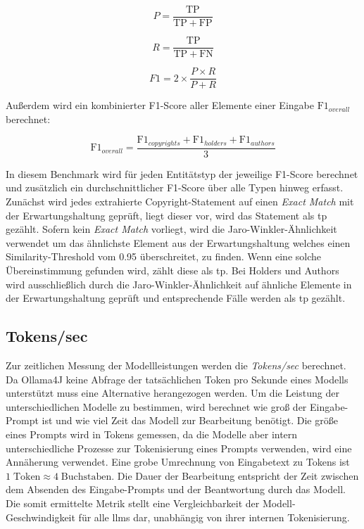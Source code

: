 \[
 P = \frac{\mathrm{TP}}{\mathrm{TP} + \mathrm{FP}}
\]

\[
 R = \frac{\mathrm{TP}}{\mathrm{TP} + \mathrm{FN}}
\]

\[
 F1 = 2 \times \frac{P \times R}{P + R}
\]

Außerdem wird ein kombinierter F1-Score aller Elemente einer Eingabe $\mathrm{F1}_{overall}$ berechnet:

\[
 \mathrm{F1}_{overall} = \frac{\mathrm{F1}_{copyrights} + \mathrm{F1}_{holders} + \mathrm{F1}_{authors}}{3}
\]

In diesem Benchmark wird für jeden Entitätstyp der jeweilige F1-Score berechnet und zusätzlich ein durchschnittlicher F1-Score über alle Typen hinweg erfasst.
Zunächst wird jedes extrahierte Copyright-Statement auf einen \textit{Exact Match} mit der Erwartungshaltung geprüft, liegt dieser vor, wird das Statement als \gls{tp} gezählt.
Sofern kein \textit{Exact Match} vorliegt, wird die Jaro-Winkler-Ähnlichkeit\autocite{noauthor_jarowinkler_nodate} verwendet um das ähnlichste Element aus der Erwartungshaltung welches einen Similarity-Threshold vom \num{0,95} überschreitet, zu finden.
Wenn eine solche Übereinstimmung gefunden wird, zählt diese als \gls{tp}.
Bei Holders und Authors wird ausschließlich durch die Jaro-Winkler-Ähnlichkeit auf ähnliche Elemente in der Erwartungshaltung geprüft und entsprechende Fälle werden als \gls{tp} gezählt.

\subsection{Tokens/sec}
Zur zeitlichen Messung der Modellleistungen werden die \textit{Tokens/sec} berechnet.
Da Ollama4J keine Abfrage der tatsächlichen Token pro Sekunde eines Modells unterstützt muss eine Alternative herangezogen werden.
Um die Leistung der unterschiedlichen Modelle zu bestimmen, wird berechnet wie groß der Eingabe-Prompt ist und wie viel Zeit das Modell zur Bearbeitung benötigt.
Die größe eines Prompts wird in Tokens gemessen, da die Modelle aber intern unterschiedliche Prozesse zur Tokenisierung eines Prompts verwenden, wird eine Annäherung verwendet.
Eine grobe Umrechnung von Eingabetext zu Tokens ist $1\;\text{Token}\approx 4\;\text{Buchstaben}$\autocite{noauthor_what_nodate}.
Die Dauer der Bearbeitung entspricht der Zeit zwischen dem Absenden des Eingabe-Prompts und der Beantwortung durch das Modell.
Die somit ermittelte Metrik stellt eine Vergleichbarkeit der Modell-Geschwindigkeit für alle \glspl{llm} dar, unabhängig von ihrer internen Tokenisierung.

